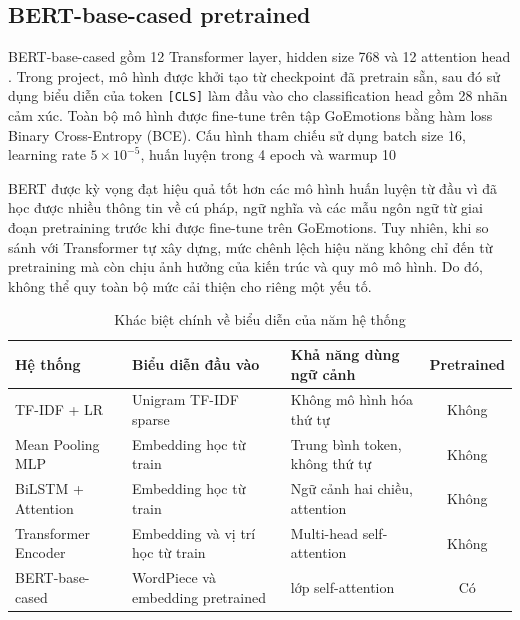 \documentclass[12pt,a4paper]{article}
\begin{document}
\subsection{BERT-base-cased pretrained}

BERT-base-cased gồm 12 Transformer layer, hidden size 768 và 12 attention head \cite{devlin2019}. Trong project, mô hình được khởi tạo từ checkpoint đã pretrain sẵn, sau đó sử dụng biểu diễn của token \texttt{[CLS]} làm đầu vào cho classification head gồm 28 nhãn cảm xúc. Toàn bộ mô hình được fine-tune trên tập GoEmotions bằng hàm loss Binary Cross-Entropy (BCE). Cấu hình tham chiếu sử dụng batch size 16, learning rate $5\times10^{-5}$, huấn luyện trong 4 epoch và warmup 10%

BERT được kỳ vọng đạt hiệu quả tốt hơn các mô hình huấn luyện từ đầu vì đã học được nhiều thông tin về cú pháp, ngữ nghĩa và các mẫu ngôn ngữ từ giai đoạn pretraining trước khi được fine-tune trên GoEmotions. Tuy nhiên, khi so sánh với Transformer tự xây dựng, mức chênh lệch hiệu năng không chỉ đến từ pretraining mà còn chịu ảnh hưởng của kiến trúc và quy mô mô hình. Do đó, không thể quy toàn bộ mức cải thiện cho riêng một yếu tố.


\begin{table}[H]
\centering
\small
\begin{tabular}{>{\raggedright\arraybackslash}p{3.0cm}>{\raggedright\arraybackslash}p{3.9cm}>{\raggedright\arraybackslash}p{4.1cm}c}
\toprule
\textbf{Hệ thống} & \textbf{Biểu diễn đầu vào} & \textbf{Khả năng dùng ngữ cảnh} & \textbf{Pretrained} \\
\midrule
TF-IDF + LR & Unigram TF-IDF sparse & Không mô hình hóa thứ tự & Không \\
Mean Pooling MLP & Embedding học từ train & Trung bình token, không thứ tự & Không \\
BiLSTM + Attention & Embedding học từ train & Ngữ cảnh hai chiều, attention & Không \\
Transformer Encoder & Embedding và vị trí học từ train & Multi-head self-attention & Không \\
BERT-base-cased & WordPiece và embedding pretrained & 12 lớp self-attention & Có \\
\bottomrule
\end{tabular}
\caption{Khác biệt chính về biểu diễn của năm hệ thống}
\label{tab:representation-summary}
\end{table}


\end{document}
